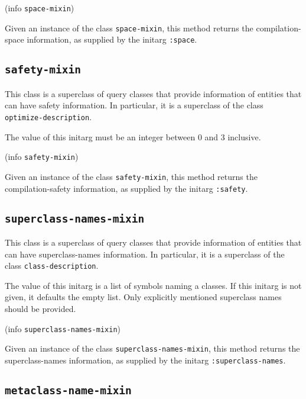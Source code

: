  {(info {\tt space-mixin})}

Given an instance of the class \texttt{space-mixin}, this method
returns the compilation-space information, as supplied by the initarg
\texttt{:space}.

\subsection{\texttt{safety-mixin}}
\label{sec-safety-mixin}

This class is a superclass of query classes that provide information
of entities that can have safety information.  In particular, it is a
superclass of the class \texttt{optimize-description}.


The value of this initarg must be an integer between $0$ and $3$
inclusive.

 {(info {\tt safety-mixin})}

Given an instance of the class \texttt{safety-mixin}, this method
returns the compilation-safety information, as supplied by the initarg
\texttt{:safety}.

\subsection{\texttt{superclass-names-mixin}}
\label{sec-superclass-names-mixin}

This class is a superclass of query classes that provide information
of entities that can have superclass-names information.  In
particular, it is a superclass of the class \texttt{class-description}.


The value of this initarg is a list of symbols naming a classes.  If
this initarg is not given, it defaults the empty list.  Only
explicitly mentioned superclass names should be provided.

 {(info {\tt superclass-names-mixin})}

Given an instance of the class \texttt{superclass-names-mixin}, this
method returns the superclass-names information, as supplied by the
initarg \texttt{:superclass-names}.

\subsection{\texttt{metaclass-name-mixin}}
\label{sec-metaclass-name-mixin}

